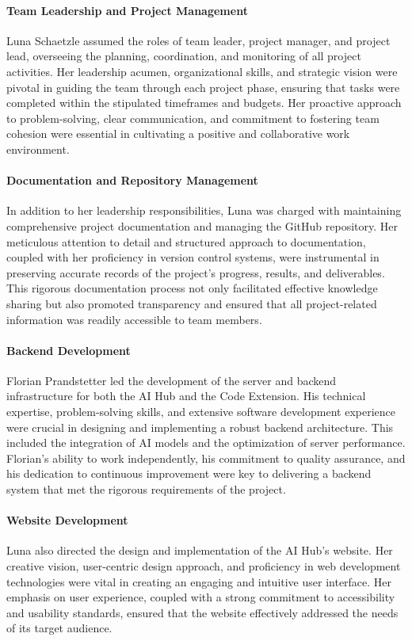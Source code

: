 \paragraph{Team Leadership and Project Management}  
Luna Schaetzle assumed the roles of team leader, project manager, and project lead, overseeing the planning, coordination, and monitoring of all project activities. Her leadership acumen, organizational skills, and strategic vision were pivotal in guiding the team through each project phase, ensuring that tasks were completed within the stipulated timeframes and budgets. Her proactive approach to problem-solving, clear communication, and commitment to fostering team cohesion were essential in cultivating a positive and collaborative work environment.

\paragraph{Documentation and Repository Management}  
In addition to her leadership responsibilities, Luna was charged with maintaining comprehensive project documentation and managing the GitHub repository. Her meticulous attention to detail and structured approach to documentation, coupled with her proficiency in version control systems, were instrumental in preserving accurate records of the project’s progress, results, and deliverables. This rigorous documentation process not only facilitated effective knowledge sharing but also promoted transparency and ensured that all project-related information was readily accessible to team members.

\paragraph{Backend Development}  
Florian Prandstetter led the development of the server and backend infrastructure for both the AI Hub and the Code Extension. His technical expertise, problem-solving skills, and extensive software development experience were crucial in designing and implementing a robust backend architecture. This included the integration of AI models and the optimization of server performance. Florian’s ability to work independently, his commitment to quality assurance, and his dedication to continuous improvement were key to delivering a backend system that met the rigorous requirements of the project.

\paragraph{Website Development}  
Luna also directed the design and implementation of the AI Hub’s website. Her creative vision, user-centric design approach, and proficiency in web development technologies were vital in creating an engaging and intuitive user interface. Her emphasis on user experience, coupled with a strong commitment to accessibility and usability standards, ensured that the website effectively addressed the needs of its target audience.


